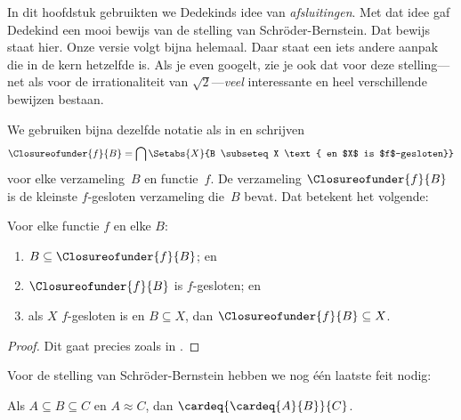 \documentclass[openany]{memoir}
\begin{document}
In dit hoofdstuk gebruikten we Dedekinds idee van \emph{afsluitingen}.
Met dat idee gaf Dedekind een mooi bewijs van de stelling van
Schr\"oder-Bernstein. Dat bewijs staat hier. Onze versie volgt
\citet[pp.~157--8]{Potter2004} bijna helemaal. Daar staat een iets
andere aanpak die in de kern hetzelfde is. Als je even googelt, zie je
ook dat voor deze stelling---net als voor de irrationaliteit van
$\sqrt{2}$---\emph{veel} interessante en heel verschillende bewijzen
bestaan.

We gebruiken bijna dezelfde notatie als in
 en schrijven
\[
\Closureofunder{f}{B} = \bigcap \Setabs{X}{B \subseteq X
\text{ en $X$ is $f$-gesloten}}
\]
voor elke verzameling~$B$ en functie~$f$. De verzameling
$\Closureofunder{f}{B}$ is de kleinste $f$-gesloten verzameling die~$B$
bevat. Dat betekent het volgende:

\begin{lem}
	Voor elke functie $f$ en elke $B$:
	\begin{enumerate}
		\item{} $B \subseteq \Closureofunder{f}{B}$; en
		\item{} $\Closureofunder{f}{B}$ is $f$-gesloten; en
		\item{} als $X$ $f$-gesloten is en $B
		\subseteq X$, dan $\Closureofunder{f}{B} \subseteq X$.
	\end{enumerate}
\end{lem}

\begin{proof}
Dit gaat precies zoals in
.
\end{proof}

Voor de stelling van Schr\"oder-Bernstein hebben we nog één laatste feit
nodig:

\begin{prop}
Als $A \subseteq B \subseteq C$ en $A \approx C$, dan $\cardeq{\cardeq{A}{B}}{C}$.
\end{prop}
\end{document}
